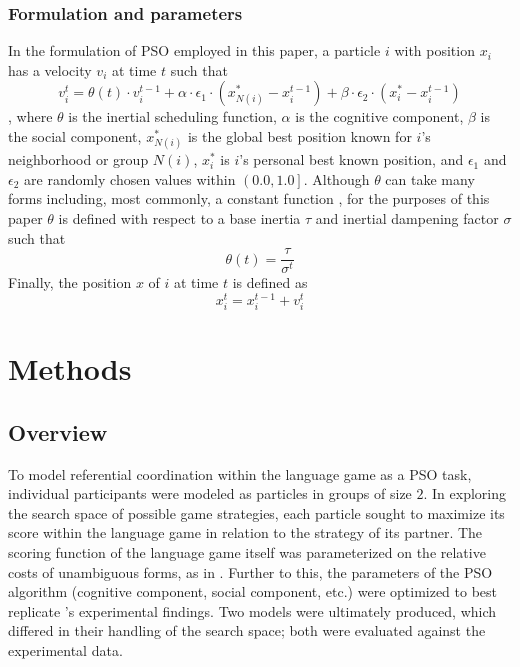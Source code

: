 \documentclass[12pt,a4paper]{article}
\begin{document}
\subsubsection{Formulation and parameters}
In the formulation of PSO employed in this paper, a particle $i$ with position $x_i$ has a velocity $v_i$ at time $t$ such that
\begin{equation}
v_i^t = \theta(t) \cdot v_i^{t-1} + \alpha \cdot \epsilon_1 \cdot (x_{N(i)}^* - x_i^{t-1}) + \beta \cdot \epsilon_2 \cdot (x_i^* - x_i^{t-1})
\end{equation},
where $\theta$ is the inertial scheduling function, $\alpha$ is the cognitive component, $\beta$ is the social component, $x_{N(i)}^*$ is the global best position known for $i$'s neighborhood or group $N(i)$, $x_i^*$ is $i$'s personal best known position, and $\epsilon_1$ and $\epsilon_2$ are randomly chosen values within $\left(0.0, 1.0\right]$. Although $\theta$ can take many forms including, most commonly, a constant function \citep[p.~101]{yang2014}, for the purposes of this paper $\theta$ is defined with respect to a base inertia $\tau$ and inertial dampening factor $\sigma$ such that
\begin{equation}
\theta(t) = \frac{\tau}{\sigma^t} 
\end{equation}
Finally, the position $x$ of $i$ at time $t$ is defined as
\begin{equation}
x_i^t = x_i^{t-1} + v_i^t 
\end{equation}

\section{Methods}

\subsection{Overview}

To model referential coordination within the \citeauthor{rohde2012} language game as a PSO task, individual participants were modeled as particles in groups of size $2$. In exploring the search space of possible game strategies, each particle sought to maximize its score within the language game in relation to the strategy of its partner. The scoring function of the language game itself was parameterized on the relative costs of unambiguous forms, as in \citeauthor{rohde2012}. Further to this, the parameters of the PSO algorithm (cognitive component, social component, etc.) were optimized to best replicate \citeauthor{rohde2012}'s experimental findings. Two models were ultimately produced, which differed in their handling of the search space; both were evaluated against the experimental data.
\end{document}
